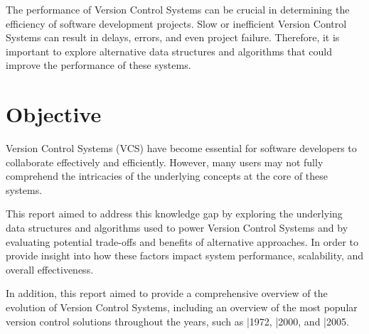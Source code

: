 The performance of Version Control Systems can be crucial in determining the efficiency of software development projects. Slow or inefficient Version Control Systems can result in delays, errors, and even project failure. Therefore, it is important to explore alternative data structures and algorithms that could improve the performance of these systems.

\section{Objective}
Version Control Systems (VCS) have become essential for software developers to collaborate effectively and efficiently. However, many users may not fully comprehend the intricacies of the underlying concepts at the core of these systems.
\vspace{9pt}

This report aimed to address this knowledge gap by exploring the underlying data structures and algorithms used to power Version Control Systems and by evaluating potential trade-offs and benefits of alternative approaches. In order to provide insight into how these factors impact system performance, scalability, and overall effectiveness.
\vspace{9pt}

In addition, this report aimed to provide a comprehensive overview of the evolution of Version Control Systems, including an overview of the most popular version control solutions throughout the years, such as |1972, |2000, and |2005.
